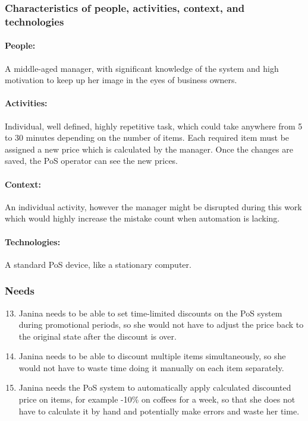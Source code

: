\documentclass{article}
\begin{document}
\subsubsection{Characteristics of people, activities, context, and technologies}
\paragraph{\small People:} A middle-aged manager, with significant knowledge of the system and high motivation to keep up her image in the eyes of business owners.
\paragraph{\small Activities:} Individual, well defined, highly repetitive task, which could take anywhere from 5 to 30 minutes depending on the number of items. Each required item must be assigned a new price which is calculated by the manager. Once the changes are saved, the PoS operator can see the new prices. 
\paragraph{\small Context:} An individual activity, however the manager might be disrupted during this work which would highly increase the mistake count when automation is lacking.
\paragraph{\small Technologies:} A standard PoS device, like a stationary computer.


\subsubsection{Needs}
\begin{enumerate}[label=N\arabic*.]
\setcounter{enumi}{12}
    \item Janina needs to be able to set time-limited discounts on the PoS system during promotional periods, so she would not have to adjust the price back to the original state after the discount is over.
    \item Janina needs to be able to discount multiple items simultaneously, so she would not have to waste time doing it manually on each item separately.
    \item Janina needs the PoS system to automatically apply calculated discounted price on items, for example -10\% on coffees for a week, so that she does not have to calculate it by hand and potentially make errors and waste her time.
\end{enumerate}
\end{document}
